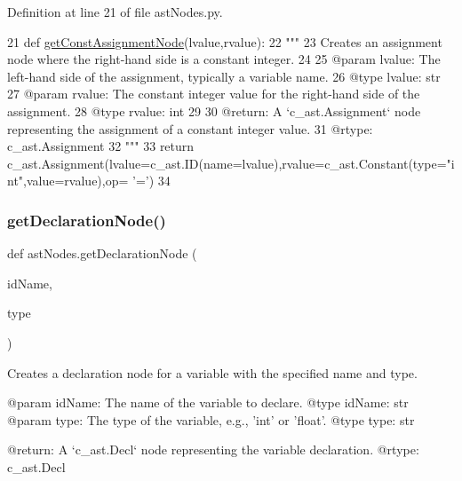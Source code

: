 Definition at line 21 of file ast\+Nodes.\+py.


\begin{DoxyCode}
21 \textcolor{keyword}{def }\hyperlink{namespaceastNodes_a95c339903d1831fd083d074239667d3e}{getConstAssignmentNode}(lvalue,rvalue):
22     \textcolor{stringliteral}{"""
}
23 \textcolor{stringliteral}{    Creates an assignment node where the right-hand side is a constant integer.
}
24 \textcolor{stringliteral}{
}
25 \textcolor{stringliteral}{    @param lvalue: The left-hand side of the assignment, typically a variable name.
}
26 \textcolor{stringliteral}{    @type lvalue: str
}
27 \textcolor{stringliteral}{    @param rvalue: The constant integer value for the right-hand side of the assignment.
}
28 \textcolor{stringliteral}{    @type rvalue: int
}
29 \textcolor{stringliteral}{
}
30 \textcolor{stringliteral}{    @return: A `c\_ast.Assignment` node representing the assignment of a constant integer value.
}
31 \textcolor{stringliteral}{    @rtype: c\_ast.Assignment
}
32 \textcolor{stringliteral}{    """}
33     \textcolor{keywordflow}{return} c\_ast.Assignment(lvalue=c\_ast.ID(name=lvalue),rvalue=c\_ast.Constant(type=\textcolor{stringliteral}{"int"},value=rvalue),op=\textcolor{stringliteral}{
      '='})
34 
\end{DoxyCode}
\mbox{\label{namespaceastNodes_ae5e5c7f09a1586002b20db6d72f6d30b}} 
\subsubsection{\texorpdfstring{get\+Declaration\+Node()}{getDeclarationNode()}}
{\footnotesize\ttfamily def ast\+Nodes.\+get\+Declaration\+Node (\begin{DoxyParamCaption}\item[{}]{id\+Name,  }\item[{}]{type }\end{DoxyParamCaption})}

\begin{DoxyVerb}Creates a declaration node for a variable with the specified name and type.

@param idName: The name of the variable to declare.
@type idName: str
@param type: The type of the variable, e.g., 'int' or 'float'.
@type type: str

@return: A `c_ast.Decl` node representing the variable declaration.
@rtype: c_ast.Decl
\end{DoxyVerb}
 

